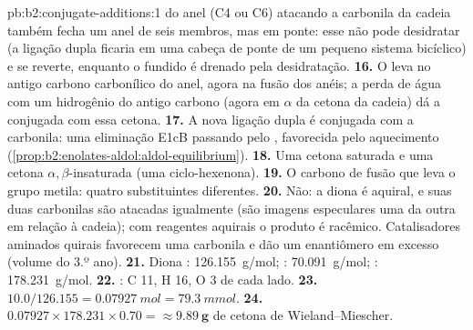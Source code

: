 \begin{solution}{pb:b2:conjugate-additions:1}
 do anel (C4 ou C6) atacando a carbonila da cadeia também fecha um anel de seis membros, mas em
ponte: esse  não pode desidratar (a ligação dupla ficaria em uma cabeça de ponte de um pequeno
sistema bicíclico) e se reverte, enquanto o  fundido é drenado pela desidratação.
\textbf{16.} O  leva  no antigo carbono carbonílico do anel, agora na fusão dos anéis; a
perda de água com um hidrogênio do antigo carbono  (agora em $\alpha$ da cetona da cadeia) dá a
 conjugada com essa cetona.
\textbf{17.} A nova ligação dupla é conjugada com a carbonila: uma eliminação E1cB passando pelo
, favorecida pelo aquecimento (\cref{prop:b2:enolates-aldol:aldol-equilibrium}).
\textbf{18.} Uma cetona saturada e uma cetona $\alpha,\beta$-insaturada (uma ciclo-hexenona).
\textbf{19.} O carbono de fusão que leva o grupo metila: quatro substituintes diferentes.
\textbf{20.} Não: a diona é aquiral, e suas duas carbonilas são atacadas igualmente (são imagens
especulares uma da outra em relação à cadeia); com reagentes aquirais o produto é racêmico.
Catalisadores aminados quirais favorecem uma carbonila e dão um enantiômero em excesso (volume do
3.º ano).
\textbf{21.} Diona : \qty{126.155}{g/mol}; : \qty{70.091}{g/mol}; :
\qty{178.231}{g/mol}.
\textbf{22.} : C 11, H 16, O 3 de cada lado.
\textbf{23.} $10.0/126.155 = \qty{0.07927}{mol} = \qty{79.3}{mmol}$.
\textbf{24.} $0.07927 \times 178.231 \times 0.70 = \boldsymbol{\approx \qty{9.89}{g}}$ de
cetona de Wieland--Miescher.
\end{solution}
